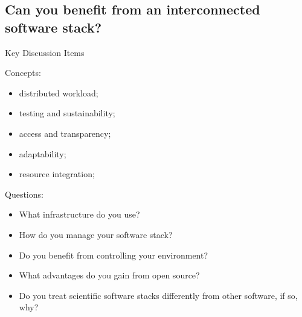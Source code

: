 		\subsection{Can you benefit from an interconnected software stack?}
			\begin{frame}{Key Discussion Items}
				\begin{minipage}{.35\textwidth}
					Concepts:
					\begin{itemize}
						\item distributed workload;
						\item testing and sustainability;
						\item access and transparency;
						\item adaptability;
						\item resource integration;
					\end{itemize}
				\end{minipage}
				\begin{minipage}{.56\textwidth}
					Questions:
					\begin{itemize}
						\item What infrastructure do you use?
						\item How do you manage your software stack?
						\item Do you benefit from controlling your environment?
						\item What advantages do you gain from open source?
						\item Do you treat scientific software stacks differently from other software, if so, why?
					\end{itemize}
				\end{minipage}
			\end{frame}

